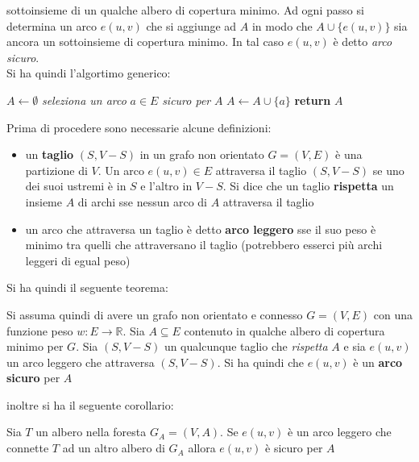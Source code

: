 \documentclass[a4paper,12pt, oneside]{book}
\begin{document}
sottoinsieme di un qualche albero di copertura minimo. Ad ogni passo
si determina un arco $e(u,v)$ che si aggiunge ad $A$ in modo che
$A\cup\{e(u,v)\}$ sia ancora un sottoinsieme di copertura minimo. In
tal caso $e(u,v)$ è detto \textit{arco sicuro}.\\
Si ha quindi l'algortimo generico:
\begin{algorithm}
  \begin{algorithmic}
    \State $A\gets \emptyset$
    \State \textit{seleziona un arco} $a\in E$ \textit{sicuro per} $A$
    \State $A\gets A\cup \{a\}$
    \EndWhile
    \State \textbf{return} $A$
    \EndFunction
  \end{algorithmic}

\end{algorithm}
Prima di procedere sono necessarie alcune definizioni:
\begin{itemize}
  \item un \textbf{taglio} $(S,V-S)$ in un grafo non orientato
  $G=(V,E)$ è una partizione di $V$. Un arco $e(u,v)\in E$ attraversa
  il taglio $(S,V-S)$ se uno dei suoi ustremi è in $S$ e l'altro in
  $V-S$. Si dice che un taglio \textbf{rispetta} un insieme $A$ di
  archi sse nessun arco di $A$ attraversa il taglio
  \item un arco che attraversa un taglio è detto \textbf{arco leggero}
  sse il suo peso è minimo tra quelli che attraversano il taglio
  (potrebbero esserci più archi leggeri di egual peso)
\end{itemize}
Si ha quindi il seguente teorema:
\begin{teorema}
  Si assuma quindi di avere un grafo non orientato e connesso $G=(V,E)$
  con una funzione peso $w:E\to\mathbb{R}$. Sia $A\subseteq E$
  contenuto in qualche albero di copertura minimo per $G$. Sia
  $(S,V-S)$ un qualcunque taglio che \textit{rispetta} $A$ e sia
  $e(u,v)$ un arco leggero che attraversa $(S,V-S)$. Si ha quindi che
  $e(u,v)$ è un \textbf{arco sicuro} per $A$
\end{teorema}
inoltre si ha il seguente corollario:
\begin{corollario}
  Sia $T$ un albero nella foresta $G_A=(V,A)$. Se $e(u,v)$ è un arco
  leggero che connette $T$ ad un altro albero di $G_A$ allora $e(u,v)$
  è sicuro per $A$
\end{corollario}
\newpage
\end{document}
